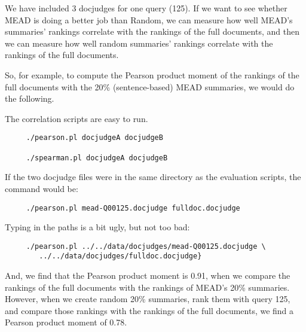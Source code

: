 \documentclass[10pt]{article}
\begin{document}
We have included 3 docjudges for one query (125).  If we want to see 
whether MEAD is doing a better job than Random, we can measure how well 
MEAD's summaries' rankings correlate with the rankings of the full 
documents, and then we can measure how well random summaries' rankings 
correlate with the rankings of the full documents.

So, for example, to compute the Pearson product moment of the 
rankings of the full documents with the 20\% (sentence-based) MEAD 
summaries, we would do the following.

The correlation scripts are easy to run.  

\begin{verbatim}
     ./pearson.pl docjudgeA docjudgeB

     ./spearman.pl docjudgeA docjudgeB
\end{verbatim}

If the two docjudge files were in the same directory as the 
evaluation scripts, the command would be:

\begin{verbatim}
     ./pearson.pl mead-Q00125.docjudge fulldoc.docjudge
\end{verbatim}

Typing in the paths is a bit ugly, but not too bad:

\begin{verbatim}
     ./pearson.pl ../../data/docjudges/mead-Q00125.docjudge \
        ../../data/docjudges/fulldoc.docjudge}
\end{verbatim}

And, we find that the Pearson product moment is 0.91, when we compare 
the rankings of the full documents with the rankings of MEAD's 
20\% summaries.  However, when we create random 20\% summaries, rank 
them with query 125, and compare those rankings with the rankings of 
the full documents, we find a Pearson product moment of 0.78.
\end{document}
